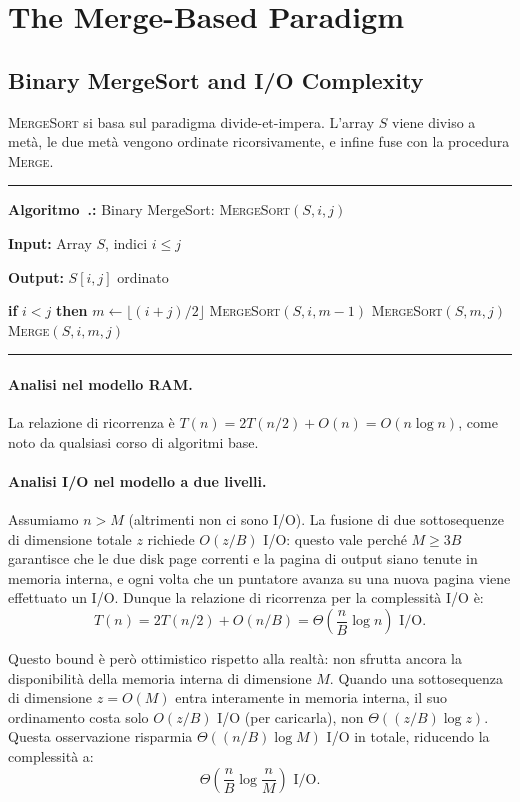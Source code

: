 \documentclass[12pt, a4paper, oneside]{book}
\newcounter{algocf}[chapter]
\renewcommand{\thealgocf}{\thechapter.\arabic{algocf}}
\newenvironment{algorithm}[1][H]{%
  \refstepcounter{algocf}%
  \par\medskip\noindent\rule{\linewidth}{0.4pt}\par\smallskip
}{%
  \par\smallskip\noindent\rule{\linewidth}{0.4pt}\par\medskip
}
\newcommand{\algcaption}[1]{\noindent\textbf{Algoritmo~\thealgocf:} #1\par\smallskip}
\newcommand{\KwIn}[1]{\noindent\textbf{Input:} #1\par}
\newcommand{\KwOut}[1]{\noindent\textbf{Output:} #1\par}
\newcommand{\If}[1]{\noindent\textbf{if} #1 \textbf{then}}
\theoremstyle{plain}
\theoremstyle{definition}
\theoremstyle{remark}
\begin{document}
\section{The Merge-Based Paradigm}

\subsection{Binary MergeSort and I/O Complexity}

\textsc{MergeSort} si basa sul paradigma divide-et-impera. L'array $S$ viene diviso a metà, le due metà vengono ordinate ricorsivamente, e infine fuse con la procedura \textsc{Merge}.

\begin{algorithm}[H]
\algcaption{Binary MergeSort: \textsc{MergeSort}$(S, i, j)$}
\KwIn{Array $S$, indici $i \le j$}
\KwOut{$S[i,j]$ ordinato}
\If{$i < j$}{
  $m \leftarrow \lfloor(i+j)/2\rfloor$\;
  \textsc{MergeSort}$(S, i, m-1)$\;
  \textsc{MergeSort}$(S, m, j)$\;
  \textsc{Merge}$(S, i, m, j)$\;
}
\end{algorithm}

\paragraph{Analisi nel modello RAM.}
La relazione di ricorrenza è $T(n) = 2T(n/2) + O(n) = O(n\log n)$, come noto da qualsiasi corso di algoritmi base.

\paragraph{Analisi I/O nel modello a due livelli.}
Assumiamo $n > M$ (altrimenti non ci sono I/O). La fusione di due sottosequenze di dimensione totale $z$ richiede $O(z/B)$ I/O: questo vale perché $M \ge 3B$ garantisce che le due disk page correnti e la pagina di output siano tenute in memoria interna, e ogni volta che un puntatore avanza su una nuova pagina viene effettuato un I/O. Dunque la relazione di ricorrenza per la complessità I/O è:
\[
T(n) = 2T(n/2) + O(n/B) = \Theta\!\left(\frac{n}{B}\log n\right) \text{ I/O}.
\]

Questo bound è però ottimistico rispetto alla realtà: non sfrutta ancora la disponibilità della memoria interna di dimensione $M$. Quando una sottosequenza di dimensione $z = O(M)$ entra interamente in memoria interna, il suo ordinamento costa solo $O(z/B)$ I/O (per caricarla), non $\Theta((z/B)\log z)$. Questa osservazione risparmia $\Theta((n/B)\log M)$ I/O in totale, riducendo la complessità a:
\[
\Theta\!\left(\frac{n}{B}\log\frac{n}{M}\right) \text{ I/O}.
\]
\end{document}
